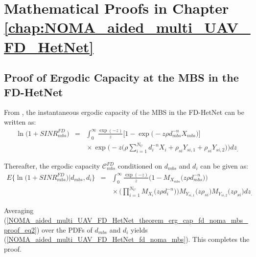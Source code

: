 \chapter{Mathematical Proofs in Chapter \ref{chap:NOMA_aided_multi_UAV_FD_HetNet}}
\label{chap:Appendix_E}

\section{Proof of Ergodic Capacity at the MBS in the FD-HetNet} \label{NOMA_aided_multi_UAV_FD_HetNet_theorem_erg_cap_fd_noma_mbs_proof}
From \cite[eq. (5)]{hamdi2010useful}, the instantaneous ergodic capacity of the MBS in the FD-HetNet can be written as:
\begin{eqnarray} \label{NOMA_aided_multi_UAV_FD_HetNet_theorem_erg_cap_fd_noma_mbs_proof_eq1}
\ln\Big(1+SINR_{mbs}^{FD}\Big) & = & \int_{0}^{\infty} \frac{\exp(-z)}{z} \big[1-\exp\big(-z\rho  d_{mbs}^{-n} X_{mbs}\big)\big] \nonumber \\
 & & \hspace{0cm} \times \exp\Bigg(-z\Bigg( \rho \sum_{i=1}^{N_U} d_i^{-n} X_{i} + \rho_{si} Y_{si,1} + \rho_{si}  Y_{si,2} \Bigg)\Bigg) dz_.
\end{eqnarray}

Thereafter, the ergodic capacity $\mathcal{C}_{mbs}^{FD}$ conditioned on $d_{mbs}$ and $d_i$ can be given as:
\begin{eqnarray} \label{NOMA_aided_multi_UAV_FD_HetNet_theorem_erg_cap_fd_noma_mbs_proof_eq2}
E\Big\{\ln\Big(1+SINR_{mbs}^{FD}\Big)\Big|d_{mbs}, d_i \Big\} & = & \int_{0}^{\infty} \frac{\exp(-z)}{z} \Bigg(1-M_{X_{mbs}}\Big(z\rho  d_{mbs}^{-n}\Big)\Bigg) \nonumber \\
 & & \hspace{0cm} \times \Bigg( \prod_{i=1}^{N_U} M_{X_i}\Big(z\rho  d_i^{-n}\Big) \Bigg) M_{Y_{si,1}}\Big(z\rho_{si} \Big) M_{Y_{si,2}}\Big(z\rho_{si} \Big) dz_.
\end{eqnarray}

Averaging (\ref{NOMA_aided_multi_UAV_FD_HetNet_theorem_erg_cap_fd_noma_mbs_proof_eq2}) over the PDFs of $d_{mbs}$ and $d_i$ yields (\ref{NOMA_aided_multi_UAV_FD_HetNet_fd_noma_mbs}). This completes the proof.

